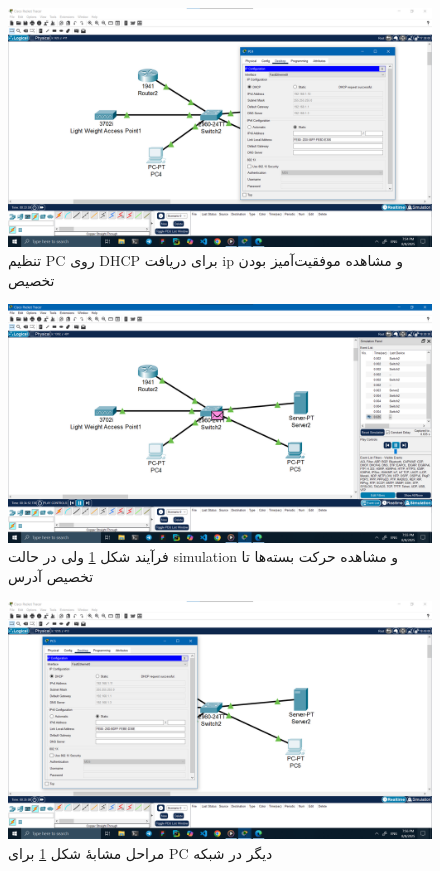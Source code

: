 \documentclass[12pt]{article}
\begin{document}
	\begin{figure}[H]
		\centering
		\includegraphics[width=\textwidth]{resources/scenario1-7.png}
		\caption{تنظیم \textenglish{PC} روی \textenglish{DHCP} برای دریافت \textenglish{ip} و مشاهده موفقیت‌آمیز بودن تخصیص}
		\label{1:7}
	\end{figure}
	\begin{figure}[H]
		\centering
		\includegraphics[width=\textwidth]{resources/scenario1-8.png}
		\caption{فرآیند شکل \ref{1:7} ولی در حالت \textenglish{simulation} و مشاهده حرکت بسته‌ها تا تخصیص آدرس}
		\label{1:8}
	\end{figure}
	\begin{figure}[H]
		\centering
		\includegraphics[width=\textwidth]{resources/scenario1-9.png}
		\caption{مراحل مشابهٔ شکل \ref{1:7} برای \textenglish{PC} دیگر در شبکه}
		\label{1:9}
	\end{figure}
	\newpage
\end{document}
